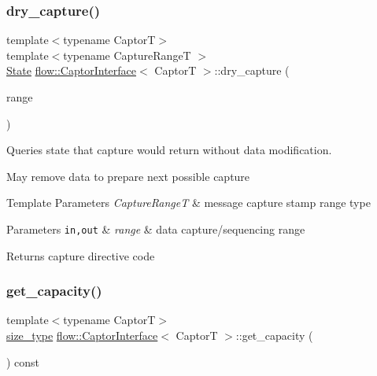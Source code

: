 \subsubsection{\texorpdfstring{dry\+\_\+capture()}{dry\_capture()}}
{\footnotesize\ttfamily template$<$typename CaptorT$>$ \\
template$<$typename Capture\+RangeT $>$ \\
\hyperlink{namespaceflow_adefe9726e597eb50c46f0f6a202018e9}{State} \hyperlink{classflow_1_1_captor_interface}{flow\+::\+Captor\+Interface}$<$ CaptorT $>$\+::dry\+\_\+capture (\begin{DoxyParamCaption}\item[{Capture\+RangeT \&\&}]{range }\end{DoxyParamCaption})\hspace{0.3cm}{\ttfamily [inline]}}



Queries state that {\ttfamily capture} would return without data modification. 

May remove data to prepare next possible capture


\begin{DoxyTemplParams}{Template Parameters}
{\em Capture\+RangeT} & message capture stamp range type\\
\hline
\end{DoxyTemplParams}

\begin{DoxyParams}[1]{Parameters}
\mbox{\tt in,out}  & {\em range} & data capture/sequencing range\\
\hline
\end{DoxyParams}
\begin{DoxyReturn}{Returns}
capture directive code 
\end{DoxyReturn}
\mbox{\label{classflow_1_1_captor_interface_a84ee393ca53d595bb20057445334eb78}} 
\subsubsection{\texorpdfstring{get\+\_\+capacity()}{get\_capacity()}}
{\footnotesize\ttfamily template$<$typename CaptorT$>$ \\
\hyperlink{classflow_1_1_captor_interface_a62db6a158eebcb377e63ede6a1f1a8c6}{size\+\_\+type} \hyperlink{classflow_1_1_captor_interface}{flow\+::\+Captor\+Interface}$<$ CaptorT $>$\+::get\+\_\+capacity (\begin{DoxyParamCaption}{ }\end{DoxyParamCaption}) const\hspace{0.3cm}{\ttfamily [inline]}}



